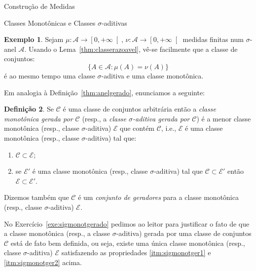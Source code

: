 \documentclass[oneside,final,11pt]{amsbook}
\theoremstyle{remark}\newtheorem{exercise}{Exercício}[chapter]
\theoremstyle{remark}\newtheorem{*exercise}[exercise]{\hbox to 0pt{\hskip 0pt minus 1fil*}Exercício}
\theoremstyle{definition}\newtheorem{exdefin}{Definição}[chapter]
\theoremstyle{plain}\newtheorem{teo}{Teorema}[section]
\theoremstyle{plain}\newtheorem{lem}[teo]{Lema}
\theoremstyle{plain}\newtheorem{prop}[teo]{Proposição}
\theoremstyle{plain}\newtheorem{cor}[teo]{Corolário}
\theoremstyle{definition}\newtheorem{defin}[teo]{Definição}
\theoremstyle{remark}\newtheorem{rem}[teo]{Observação}
\theoremstyle{definition}\newtheorem{notation}[teo]{Notação}
\theoremstyle{definition}\newtheorem{convention}[teo]{Convenção}
\theoremstyle{definition}\newtheorem{example}[teo]{Exemplo}
\numberwithin{section}{chapter}
\numberwithin{equation}{section}
\begin{document}
\begin{chapter}{Construção de Medidas}
\begin{section}{Classes Monotônicas e Classes ${\sigma}$-aditivas}
\begin{example}\label{exa:muigualnu}
Sejam $\mu:\mathcal A\to\left[0,+\infty\right[$, $\nu:\mathcal A\to\left[0,+\infty\right[$ medidas finitas num
$\sigma$-anel $\mathcal A$. Usando o Lema~\ref{thm:classerazoavel}, vê-se facilmente que a classe de conjuntos:
\begin{equation}\label{eq:muigualnu}
\big\{A\in\mathcal A:\mu(A)=\nu(A)\big\}
\end{equation}
é ao mesmo tempo uma classe $\sigma$-aditiva e uma classe monotônica.
\end{example}

Em analogia à Definição~\ref{thm:anelgerado}, enunciamos a seguinte:
\begin{defin}\label{thm:sigmonotgerado}
Se $\mathcal C$ é uma classe de conjuntos arbitrária então a
{\em classe monotônica gerada por $\mathcal C$\/} (resp., a
{\em classe $\sigma$-aditiva gerada por $\mathcal C$}) é a menor classe monotônica (resp., classe $\sigma$-aditiva) $\mathcal E$ que contém $\mathcal C$, i.e.,
$\mathcal E$ é uma classe monotônica (resp., classe $\sigma$-aditiva) tal que:
\begin{enumerate}
\item\label{itm:sigmonotger1} $\mathcal C\subset\mathcal E$;
\item\label{itm:sigmonotger2} se $\mathcal E'$ é uma classe monotônica (resp., classe $\sigma$-aditiva) tal que
$\mathcal C\subset\mathcal E'$ então $\mathcal E\subset\mathcal E'$.
\end{enumerate}
Dizemos também que $\mathcal C$ é um {\em conjunto de geradores\/}%
%
para a classe monotônica (resp., classe $\sigma$-aditiva) $\mathcal E$.
\end{defin}
No Exercício~\ref{exe:sigmonotgerado} pedimos ao leitor para justificar o fato de que a classe monotônica (resp.,
a classe $\sigma$-aditiva) gerada por uma classe de conjuntos $\mathcal C$ está de fato bem definida,
ou seja, existe uma única classe monotônica (resp., classe $\sigma$-aditiva) $\mathcal E$ satisfazendo as propriedades
\eqref{itm:sigmonotger1} e \eqref{itm:sigmonotger2} acima.


\end{section}
\end{chapter}
\end{document}
